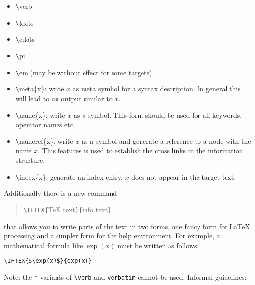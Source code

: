 \begin{itemize}
\item  \verb|\|verb

\item  \verb|\|ldots

\item  \verb|\|cdots

\item  \verb|\|pi

\item  \verb|\|em (may be without effect for some targets)

\item  \verb|\|meta\{x\}: write $x$ as meta symbol for a syntax
description. In general this will lead to an output similar to $x$.

\item  \verb|\|name\{x\}: write $x$ as a \REDUCE symbol. This form should be
used for all keywords, operator names etc.

\item  \verb|\|nameref\{x\}: write $x$ as a \REDUCE symbol and generate a
reference to a node with the name $x$. This features is used to establish
the cross links in the information structure.

\item  \verb|\|index\{x\}: generate an index entry. $x$ does not appear in
the target text.
\end{itemize}

Additionally there is a new command

\begin{quotation}
\verb|\IFTEX{|\TeX{} text\verb|}{|info text\verb|}|
\end{quotation}

that allows you to write parts of the text in two forms, one fancy form for 
\LaTeX{} processing and a simpler form for the help environment. For
example, a mathematical formula like $\exp (x)$ must be written as follows: 
\begin{verbatim}
\IFTEX{$\exp(x)$}{exp(x)}
\end{verbatim}

Note: the \verb|*| variants of \verb|\verb| and \verb|verbatim| cannot be
used. Informal guidelines:

